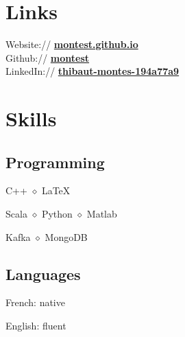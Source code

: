 \documentclass[]{deedy-resume-openfont}
\begin{document}
\begin{minipage}[t]{0.33\textwidth}

\vspace{\topsep}
\vspace{\topsep}
\section{Links}
Website:// \href{https://montest.github.io}{\bf montest.github.io} \\
Github:// \href{https://github.com/montest}{\bf montest} \\
LinkedIn:// \href{https://www.linkedin.com/in/thibaut-montes-194a77a9}{\bf thibaut-montes-194a77a9}


\vspace{\topsep}
\vspace{\topsep}
\section{Skills}

\subsection{Programming}
\vspace{\topsep}
\begin{tightemize}
\item {}
C++ $\diamond$ \LaTeX \\
\item {}
Scala $\diamond$ Python $\diamond$ Matlab \\
\item {}
Kafka $\diamond$ MongoDB
\end{tightemize}

\sectionsep
\subsection{Languages}
\vspace{\topsep}
\begin{tightemize}
\item French: native
\item English: fluent
\end{tightemize}


\end{minipage}
\end{document}
